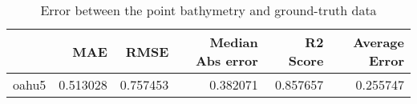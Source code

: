 \begin{table}[h!]
\caption{Error between the point bathymetry and ground-truth data}
\label{tab:oahu5_lidar_error}
\begin{tabular}{lrrrrr}
\toprule
 & MAE & RMSE & Median Abs error & R2 Score & Average Error \\
\midrule
oahu5 & 0.513028 & 0.757453 & 0.382071 & 0.857657 & 0.255747 \\
\bottomrule
\end{tabular}
\end{table}
